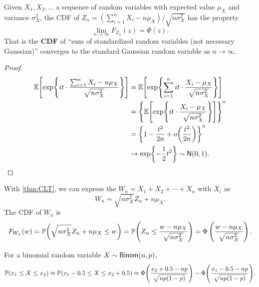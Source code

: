 \begin{theorem}
    \label{thm:CLT}
    Given $X_1, X_2,\ldots$ a sequence of \iid random variables with expected value $\mu_X$ and variance $\sigma_X^2$, the \textnormal{CDF} of $Z_n=(\sum_{i=1}^{n}X_i-n\mu_X)/\sqrt{n\sigma_X^2}$ has the property
    \[\lim_{n\rightarrow \infty}F_{Z_n}(z)=\Phi(z).\]
    That is the \textbf{CDF} of ``sum of standardized \iid random variables (not necessary Gaussian)'' converges to the standard Gaussian random variable as $n\rightarrow\infty$.
\end{theorem}

\begin{proof}
    \begin{align*}
        \E{\exp\braces*{it\cdot \frac{\sum_{i=1}^{n}X_i-n\mu_X}{\sqrt{n\sigma_X^2}}}}
        &= \E{\exp\braces*{\sum_{i=1}^{n} it\cdot \frac{X_i-\mu_X}{\sqrt{n\sigma_X^2}}}} \\
        &= \braces*{\E{\exp\braces*{it\cdot \frac{X_i-\mu_X}{\sqrt{n\sigma_X^2}}}}}^n \\
        &= \braces*{1-\frac{t^2}{2n}+o\parens*{\frac{t^2}{2n}}}^n \\
        &\rightarrow \exp\braces*{-\frac{1}{2}t^2} \sim \Gaus(0,1).
    \end{align*}
\end{proof}

\begin{corollary}
    With \cref{thm:CLT}, we can express the $W_n=X_1+X_2+\cdots+X_n$ with \iid $X_i$ as
    \[W_n=\sqrt{n\sigma_X^2}Z_n+n\mu_X.\]
    The \textnormal{CDF} of $W_n$ is
    \[F_{W_n}(w)=\P{\sqrt{n\sigma_X^2}Z_n+n\mu_X\leq w}=\P{Z_n\leq \frac{w-n\mu_X}{\sqrt{n\sigma_X^2}}}=\Phi\left(\frac{w-n\mu_X}{\sqrt{n\sigma_X^2}}\right).\]
\end{corollary}

\begin{theorem}
    \label{thm:DeMoivreLaplace}
    For a binomial random variable $X\sim \mathsf{Binom}(n,p)$,
    \[\P{x_1\leq X\leq x_2}\approx \P{x_1-0.5\leq X\leq x_2+0.5}\approx \Phi\parens*{\frac{x_2+0.5-np}{\sqrt{np(1-p)}}}-\Phi\parens*{\frac{x_1-0.5-np}{\sqrt{np(1-p)}}}.\]
\end{theorem}
